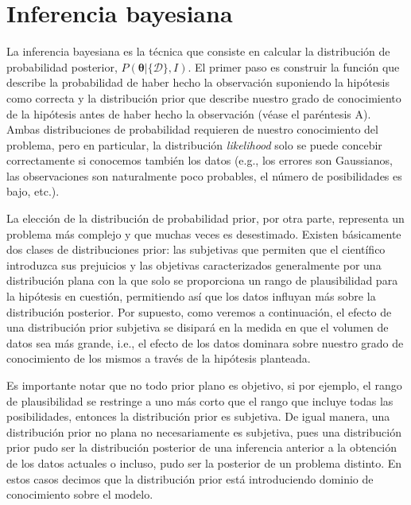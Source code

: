 \documentclass[a4paper,twoside]{article}
\newcommand{\hip}{\ensuremath{\bm{\theta}}\xspace}
\newcommand{\dat}{\ensuremath{\{\mathcal{D}\}}\xspace}
\begin{document}

\section{Inferencia bayesiana}
%
La inferencia bayesiana es la técnica que consiste en calcular la distribución de probabilidad
posterior, $P(\hip|\dat,I)$. El primer paso es construir la función que describe la probabilidad de
haber hecho la observación suponiendo la hipótesis como correcta y la distribución prior que
describe nuestro grado de conocimiento de la hipótesis antes de haber hecho la observación (véase el
paréntesis A). Ambas distribuciones de probabilidad requieren de nuestro conocimiento del problema,
pero en particular, la distribución \emph{likelihood} solo se puede concebir correctamente si
conocemos también los datos (e.g., los errores son Gaussianos, las observaciones son naturalmente
poco probables, el número de posibilidades es bajo, etc.).

La elección de la distribución de probabilidad prior, por otra parte, representa un problema más
complejo y que muchas veces es desestimado. Existen básicamente dos clases de distribuciones prior:
las subjetivas que permiten que el científico introduzca sus prejuicios y las objetivas
caracterizados generalmente por una distribución plana con la que solo se proporciona un rango de
plausibilidad para la hipótesis en cuestión, permitiendo así que los datos influyan más sobre la
distribución posterior. Por supuesto, como veremos a continuación, el efecto de una distribución
prior subjetiva se disipará en la medida en que el volumen de datos sea más grande, i.e., el efecto
de los datos dominara sobre nuestro grado de conocimiento de los mismos a través de la hipótesis
planteada.

Es importante notar que no todo prior plano es objetivo, si por ejemplo, el rango de plausibilidad
se restringe a uno más corto que el rango que incluye todas las posibilidades, entonces la
distribución prior es subjetiva. De igual manera, una distribución prior no plana no necesariamente
es subjetiva, pues una distribución prior pudo ser la distribución posterior de una inferencia
anterior a la obtención de los datos actuales o incluso, pudo ser la posterior de un problema
distinto. En estos casos decimos que la distribución prior está introduciendo dominio de
conocimiento sobre el modelo.

\end{document}
